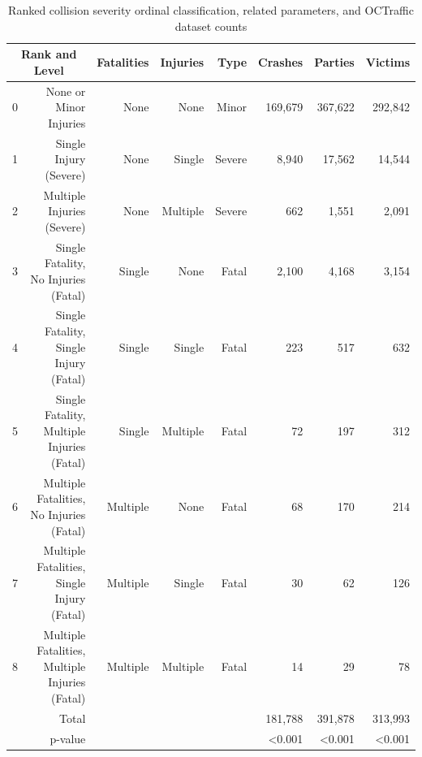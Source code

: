 \begin{table}[h!]
\caption{Ranked collision severity ordinal classification, related parameters, and OCTraffic dataset counts}
\label{tbl2}
\begin{tabular}{crrrrrrr}
\toprule
\multicolumn{2}{c}{Rank and Level} & Fatalities & Injuries & Type & Crashes & Parties & Victims \\
\midrule
0 & None or Minor Injuries & None & None & Minor & 169,679 & 367,622 & 292,842 \\
1 & Single Injury (Severe) & None & Single & Severe & 8,940 & 17,562 & 14,544 \\
2 & Multiple Injuries (Severe) & None & Multiple & Severe & 662 & 1,551 & 2,091 \\
3 & Single Fatality, No Injuries (Fatal) & Single & None & Fatal & 2,100 & 4,168 & 3,154 \\
4 & Single Fatality, Single Injury (Fatal) & Single & Single & Fatal & 223 & 517 & 632 \\
5 & Single Fatality, Multiple Injuries (Fatal) & Single & Multiple & Fatal & 72 & 197 & 312 \\
6 & Multiple Fatalities, No Injuries (Fatal) & Multiple & None & Fatal & 68 & 170 & 214 \\
7 & Multiple Fatalities, Single Injury (Fatal) & Multiple & Single & Fatal & 30 & 62 & 126 \\
8 & Multiple Fatalities, Multiple Injuries (Fatal) & Multiple & Multiple & Fatal & 14 & 29 & 78 \\
\midrule
 & Total &  &  &  & 181,788 & 391,878 & 313,993 \\
 & p-value\footnotemark[1] &  &  &  & \textless{}0.001 & \textless{}0.001 & \textless{}0.001 \\
\bottomrule
\end{tabular}
\end{table}
